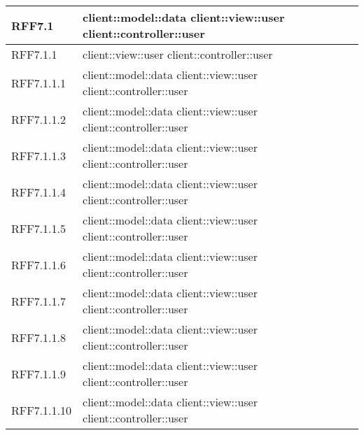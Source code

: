 \begin{center}
\begin{longtable}{| p{4cm} | p{8cm} |}
\hline
RFF7.1 & client::model::data \newline client::view::user \newline client::controller::user \\
\hline
RFF7.1.1 & client::view::user \newline client::controller::user \\
\hline
RFF7.1.1.1 & client::model::data \newline client::view::user \newline client::controller::user \\
\hline
RFF7.1.1.2 & client::model::data \newline client::view::user \newline client::controller::user \\
\hline
RFF7.1.1.3 & client::model::data \newline client::view::user \newline client::controller::user \\
\hline
RFF7.1.1.4 & client::model::data \newline client::view::user \newline client::controller::user \\
\hline
RFF7.1.1.5 & client::model::data \newline client::view::user \newline client::controller::user \\
\hline
RFF7.1.1.6 & client::model::data \newline client::view::user \newline client::controller::user \\
\hline
RFF7.1.1.7 & client::model::data \newline client::view::user \newline client::controller::user \\
\hline
RFF7.1.1.8 & client::model::data \newline client::view::user \newline client::controller::user \\
\hline
RFF7.1.1.9 & client::model::data \newline client::view::user \newline client::controller::user \\
\hline
RFF7.1.1.10 & client::model::data \newline client::view::user \newline client::controller::user \\

\end{longtable}
\end{center}
